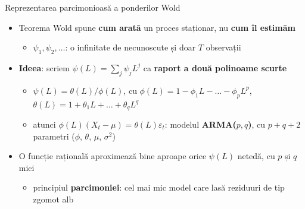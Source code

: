 \begin{frame}{Reprezentarea parcimonioasă a ponderilor Wold}
\itemsize{\small}
\begin{itemize}
    \item Teorema Wold spune \textbf{cum arată} un proces staționar, nu \textbf{cum îl estimăm}
    \begin{itemize}
        \item $\psi_1, \psi_2, \dots$: o infinitate de necunoscute și doar $T$ observații
    \end{itemize}
    \item \textbf{Ideea}: scriem $\psi(L) = \sum_j\psi_jL^j$ ca \textbf{raport a două polinoame scurte}
    \begin{itemize}
        \item $\psi(L) = \theta(L)/\phi(L)$, cu $\phi(L) = 1 - \phi_1L - \dots - \phi_pL^p$, $\theta(L) = 1 + \theta_1L + \dots + \theta_qL^q$
        \item atunci $\phi(L)(X_t - \mu) = \theta(L)\varepsilon_t$: modelul \textbf{ARMA($p,q$)}, cu $p + q + 2$ parametri ($\phi$, $\theta$, $\mu$, $\sigma^2$)
    \end{itemize}
    \item O funcție rațională aproximează bine aproape orice $\psi(L)$ netedă, cu $p$ și $q$ mici
    \begin{itemize}
        \item principiul \textbf{parcimoniei}: cel mai mic model care lasă reziduuri de tip zgomot alb
    \end{itemize}
\end{itemize}
\end{frame}

